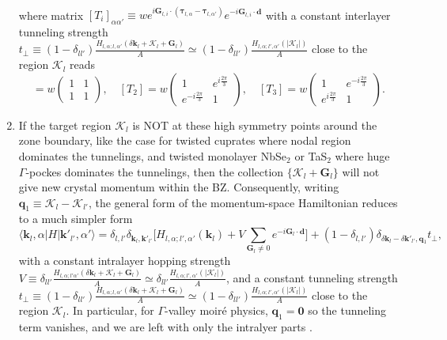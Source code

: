 \begin{enumerate}
\begin{align}
          \end{align}
          where matrix $[T_i]_{\alpha\alpha'}\equiv w e^{i\bm G_{l,i}\cdot(\bm\tau_{l,\alpha}-\bm\tau_{l,\alpha'})}e^{-i\bm G_{l,i}\cdot\bm d}$ with a constant interlayer tunneling strength $t_\perp\equiv(1-\delta_{ll'})\frac{H_{l,\alpha;l,\alpha'}(\delta\bm k_l+\bm{\mathcal K}_l+\bm G_l)}{A}\simeq(1-\delta_{ll'})\frac{H_{l,\alpha;l',\alpha'}(|\bm{\mathcal K}_l|)}{A}$ close to the region $\bm{\mathcal K}_l$ reads
          \begin{equation*}
              [T_1]=w\begin{pmatrix}
                  1 & 1 \\
                  1 & 1
              \end{pmatrix},\quad [T_2]=w\begin{pmatrix}
                  1                    & e^{i\frac{2\pi}{3}} \\
                  e^{-i\frac{2\pi}{3}} & 1
              \end{pmatrix},\quad [T_3]=w\begin{pmatrix}
                  1                   & e^{-i\frac{2\pi}{3}} \\
                  e^{i\frac{2\pi}{3}} & 1
              \end{pmatrix}.
          \end{equation*}

    \item If the target region $\bm{\mathcal K}_l$ is NOT at these high symmetry points around the zone boundary, like the case for twisted cuprates where nodal region dominates the tunnelings, and twisted monolayer NbSe$_2$ or TaS$_2$ where huge $\Gamma$-pockes dominates the tunnelings, then the collection $\{\bm{\mathcal K}_l+\bm G_l\}$ will not give new crystal momentum within the BZ. Consequently, writing $\bm q_1\equiv\bm{\mathcal K}_l-\bm{\mathcal K}_{l'}$, the general form of the momentum-space Hamiltonian reduces to a much simpler form
          \begin{equation}\label{eq:two-center_approximation_out_of_high_symmetry_point}
              \langle \bm k_l,\alpha|H|\bm k'_{l'},\alpha'\rangle = \delta_{l,l'}\delta_{\bm k_l,\bm k'_{l'}}\bigg[H_{l,\alpha;l',\alpha'}(\bm k_l)+V\sum_{\bm G_l\neq 0}e^{-i\bm G_l\cdot\bm d}\bigg]+(1-\delta_{l,l'})\delta_{\delta\bm k_l-\delta\bm k'_{l'},\bm q_1}t_\perp,
          \end{equation}
          with a constant intralayer hopping strength $V\equiv\delta_{ll'}\frac{H_{l,\alpha;l'\alpha'}(\delta\bm k_l+\bm{\mathcal K}_l+\bm G_l)}{A}\simeq \delta_{ll'}\frac{H_{l,\alpha;l',\alpha'}(|\bm{\mathcal K}_l|)}{A}$, and a constant tunneling strength $t_\perp\equiv(1-\delta_{ll'})\frac{H_{l,\alpha;l,\alpha'}(\delta\bm k_l+\bm{\mathcal K}_l+\bm G_l)}{A}\simeq(1-\delta_{ll'})\frac{H_{l,\alpha;l',\alpha'}(|\bm{\mathcal K}_l|)}{A}$ close to the region $\bm{\mathcal K}_l$. In particular, for $\Gamma$-valley moir\'e physics, $\bm q_1=\bm 0$ so the tunneling term vanishes, and we are left with only the intralyer parts \cite{angeli2021gamma}.
\end{enumerate}




